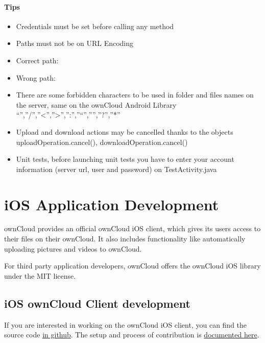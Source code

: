 \documentclass[letterpaper,10pt,english]{sphinxmanual}
\begin{document}
\paragraph{Tips}
\label{android_library/examples:tips}\begin{itemize}
\item {} 
Credentials must be set before calling any method

\item {} 
Paths must not be on URL Encoding

\item {} 
Correct path: 

\item {} 
Wrong path: 

\item {} 
There are some forbidden characters to be used in folder and files names on the server, same on the ownCloud Android Library ``'',''/'',''\textless{}'',''\textgreater{}'','':'',''``'',''\textbar{}'',''?'',''*''

\item {} 
Upload and download actions may be cancelled thanks to the objects uploadOperation.cancel(), downloadOperation.cancel()

\item {} 
Unit tests, before launching unit tests you have to enter your account information (server url, user and password) on TestActivity.java

\end{itemize}


\section{iOS Application Development}
\label{ios_library/index:ios-application-development}\label{ios_library/index::doc}
ownCloud provides an official ownCloud iOS client, which gives its users
access to their files on their ownCloud. It also includes functionality like
automatically uploading pictures and videos to ownCloud.

For third party application developers, ownCloud offers the ownCloud iOS
library under the MIT license.


\subsection{iOS ownCloud Client development}
\label{ios_library/index:ios-owncloud-client-development}
If you are interested in working on the ownCloud iOS client, you can find
the source code \href{https://github.com/owncloud/ios}{in github}. The
setup and process of contribution is
\href{https://github.com/owncloud/ios/blob/master/SETUP.md}{documented here}.
\end{document}

